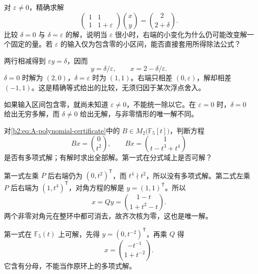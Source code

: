 \begin{exercise}\label{b2:ex:A-near-singular-solutions}
	对 \(\varepsilon\ne0\)，精确求解
	\[
		\begin{pmatrix}1&1\\1&1+\varepsilon\end{pmatrix}
		\binom{x}{y}=\binom{2}{2+\delta}.
	\]
	比较 \(\delta=0\) 与 \(\delta=\varepsilon\) 的解，说明当 \(\varepsilon\) 很小时，右端的小变化为什么仍可能改变解一个固定的量。若 \(\varepsilon\) 的输入仅为包含零的小区间，能否直接套用所得除法公式？
\end{exercise}
\begin{solution}
	两行相减得到 \(\varepsilon y=\delta\)，因而
	\[
		y=\delta/\varepsilon,\qquad x=2-\delta/\varepsilon.
	\]
	\(\delta=0\) 时解为 \((2,0)\)，\(\delta=\varepsilon\) 时为 \((1,1)\)。右端只相差 \((0,\varepsilon)\)，解却相差 \((-1,1)\)。这是精确等式给出的比较，无须归因于某次浮点舍入。

	如果输入区间包含零，就尚未知道 \(\varepsilon\ne0\)，不能统一除以它。在 \(\varepsilon=0\) 时，\(\delta=0\) 给出无穷多解，而 \(\delta\ne0\) 给出无解，与非零情形的唯一解不同。
\end{solution}

\begin{exercise}\label{b2:ex:A-polynomial-system}
	对\eqref{b2:eq:A-polynomial-certificate}中的 \(B\in M_2\bigl(\mathbb F_5[t]\bigr)\)，判断方程
	\[
		Bx=\binom{0}{t^2},\qquad Bx=\binom{1}{t-t^3+t^4}
	\]
	是否有多项式解；有解时求出全部解。第一式在分式域上是否可解？
\end{exercise}
\begin{solution}
	第一式左乘 \(P\) 后右端仍为 \((0,t^2)^{\mathsf T}\)，而 \(t^4\nmid t^2\)，所以没有多项式解。第二式左乘 \(P\) 后右端为 \((1,t^4)^{\mathsf T}\)，对角方程的解是 \(y=(1,1)^{\mathsf T}\)。所以
	\[
		x=Qy=\binom{1-t}{1+t^2-t}.
	\]
	两个非零对角元在整环中都可消去，故齐次核为零，这也是唯一解。

	第一式在 \(\mathbb F_5(t)\) 上可解，先得 \(y=(0,t^{-2})^{\mathsf T}\)，再乘 \(Q\) 得
	\[
		x=\binom{-t^{-1}}{1+t^{-2}}.
	\]
	它含有分母，不能当作原环上的多项式解。
\end{solution}

